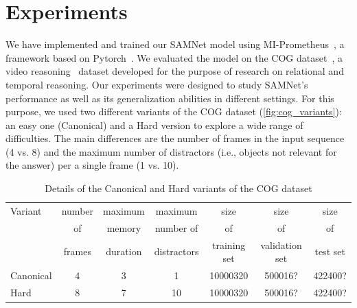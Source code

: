 \section{Experiments}

We have implemented and trained our SAMNet model using MI-Prometheus~\cite{kornuta2018accelerating}, a framework based on Pytorch~\cite{paszke2017automatic}. 
We evaluated the model on the COG dataset~\cite{yang2018dataset}, a video reasoning~\cite{mogadala2019trends} dataset developed for the purpose of research on relational and temporal reasoning.
Our experiments were designed to study SAMNet's performance as well as its generalization abilities in different settings.
For this purpose, we used two different variants of the COG dataset (\cref{fig:cog_variants}): an easy one (Canonical) and a Hard version to explore a wide range of difficulties.
The main differences are the number of frames in the input sequence (4 vs. 8) and the maximum number of distractors (i.e., objects not relevant for the answer) per a single frame (1 vs. 10).


\begin{table}[htb]
\caption{Details of the Canonical and Hard variants of the COG dataset}
\centering
\begin{tabular}{lcccccc}
	\toprule
	Variant    &  	number &  	maximum & maximum & size & size & size  \\ 
	& of   & memory & number of & of & of & of  \\
	& frames & duration & distractors & training set & validation set & test set \\
	\midrule
	Canonical & 4 & 3 & 1 & 10000320 & 500016? & 422400? \\	
	Hard  & 8 & 7 & 10 & 10000320 & 500016?  & 422400? \\
	\bottomrule	
\end{tabular}
\label{tab:cog_variants}
\end{table}




%
%

